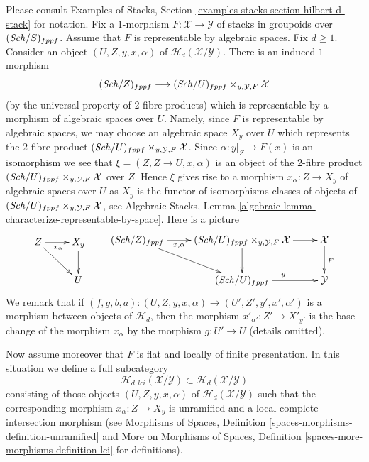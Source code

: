 \noindent
Please consult
Examples of Stacks, Section \ref{examples-stacks-section-hilbert-d-stack}
for notation. Fix a $1$-morphism $F : \mathcal{X} \longrightarrow \mathcal{Y}$
of stacks in groupoids over $(\mathit{Sch}/S)_{fppf}$. Assume that
$F$ is representable by algebraic spaces. Fix $d \geq 1$. Consider an
object $(U, Z, y, x, \alpha)$ of $\mathcal{H}_d(\mathcal{X}/\mathcal{Y})$.
There is an induced $1$-morphism
$$
(\mathit{Sch}/Z)_{fppf}
\longrightarrow
(\mathit{Sch}/U)_{fppf} \times_{y, \mathcal{Y}, F} \mathcal{X}
$$
(by the universal property of $2$-fibre products) which is representable by
a morphism of algebraic spaces over $U$.
Namely, since $F$ is representable by algebraic spaces, we may choose
an algebraic space $X_y$ over $U$ which represents the $2$-fibre product
$(\mathit{Sch}/U)_{fppf} \times_{y, \mathcal{Y}, F} \mathcal{X}$.
Since $\alpha : y|_Z \to F(x)$ is an isomorphism we see that
$\xi = (Z, Z \to U, x, \alpha)$ is an object of the $2$-fibre product
$(\mathit{Sch}/U)_{fppf} \times_{y, \mathcal{Y}, F} \mathcal{X}$ over $Z$.
Hence $\xi$ gives rise to a morphism $x_\alpha : Z \to X_y$ of algebraic spaces
over $U$ as $X_y$ is the functor of isomorphisms classes of objects of
$(\mathit{Sch}/U)_{fppf} \times_{y, \mathcal{Y}, F} \mathcal{X}$, see
Algebraic Stacks,
Lemma \ref{algebraic-lemma-characterize-representable-by-space}.
Here is a picture
\begin{equation}
\label{equation-relative-map}
\vcenter{
\xymatrix{
Z \ar[r]_{x_\alpha} \ar[rd] & X_y \ar[d] \\
& U
}
}
\quad\quad
\vcenter{
\xymatrix{
(\Sch/Z)_{fppf} \ar[rd] \ar[r]_-{x, \alpha} &
(\Sch/U)_{fppf} \times_{y, \mathcal{Y}, F} \mathcal{X} \ar[r] \ar[d] &
\mathcal{X} \ar[d]^F \\
& (\Sch/U)_{fppf} \ar[r]^y & \mathcal{Y}
}
}
\end{equation}
We remark that if
$(f, g, b, a) : (U, Z, y, x, \alpha) \to (U', Z', y', x', \alpha')$
is a morphism between objects of $\mathcal{H}_d$, then the morphism
$x'_{\alpha'} : Z' \to X'_{y'}$ is the base change of the morphism
$x_\alpha$ by the morphism $g : U' \to U$ (details omitted).

\medskip\noindent
Now assume moreover that $F$ is flat and locally of finite presentation.
In this situation we define a full subcategory
$$
\mathcal{H}_{d, lci}(\mathcal{X}/\mathcal{Y}) \subset
\mathcal{H}_d(\mathcal{X}/\mathcal{Y})
$$
consisting of those objects $(U, Z, y, x, \alpha)$ of
$\mathcal{H}_d(\mathcal{X}/\mathcal{Y})$ such
that the corresponding morphism $x_\alpha : Z \to X_y$ is unramified
and a local complete intersection morphism (see
Morphisms of Spaces, Definition \ref{spaces-morphisms-definition-unramified}
and
More on Morphisms of Spaces,
Definition \ref{spaces-more-morphisms-definition-lci}
for definitions).

